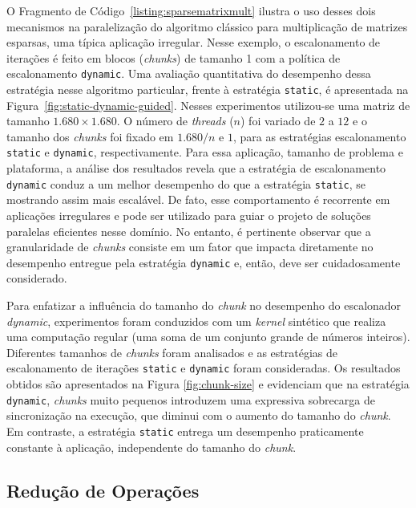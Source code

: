 \documentclass{SBCbookchapter}
\begin{document}
		O Fragmento de Código~\ref{listing:sparsematrixmult} ilustra o
		uso desses dois mecanismos na paralelização do algoritmo
		clássico para multiplicação de matrizes esparsas, uma típica
		aplicação irregular. Nesse exemplo, o escalonamento de iterações
		é feito em blocos (\textit{chunks}) de tamanho 1 com a política
		de escalonamento \texttt{dynamic}.  Uma avaliação quantitativa
		do desempenho dessa estratégia nesse algoritmo particular,
		frente à estratégia \texttt{static}, é apresentada na
		Figura~\ref{fig:static-dynamic-guided}. Nesses experimentos
		utilizou-se uma matriz de tamanho $1.680 \times 1.680$.  O
		número de \textit{threads} ($n$) foi variado de $2$ a $12$ e
		o tamanho dos \textit{chunks} foi fixado em $1.680/n$ e $1$,
		para as estratégias escalonamento \texttt{static} e
		\texttt{dynamic}, respectivamente.  Para essa aplicação,
		tamanho de problema e plataforma, a análise dos resultados
		revela que a estratégia de escalonamento \texttt{dynamic}
		conduz a um melhor desempenho do que a estratégia
		\texttt{static}, se mostrando assim mais escalável.  De
		fato, esse comportamento é recorrente em aplicações
		irregulares e pode ser utilizado para guiar o projeto de
		soluções paralelas eficientes nesse domínio. No entanto, é
		pertinente observar que a granularidade de \textit{chunks}
		consiste em um fator que impacta diretamente no desempenho
		entregue pela estratégia \texttt{dynamic} e, então, deve ser
		cuidadosamente considerado. 

		Para enfatizar a influência do tamanho do \textit{chunk} no
		desempenho do escalonador \textit{dynamic}, experimentos foram
		conduzidos com um \textit{kernel} sintético que realiza uma
		computação regular (uma soma de um conjunto grande de números
		inteiros). Diferentes tamanhos de \textit{chunks} foram
		analisados e as estratégias de escalonamento de iterações
		\texttt{static} e \texttt{dynamic} foram consideradas. Os
		resultados obtidos são apresentados na Figura
		\ref{fig:chunk-size} e evidenciam que na estratégia
		\texttt{dynamic}, \textit{chunks} muito pequenos introduzem uma
		expressiva sobrecarga de sincronização na execução, que diminui
		com o aumento do tamanho do \textit{chunk}. Em contraste, a
		estratégia \texttt{static} entrega um desempenho praticamente
		constante à aplicação, independente do tamanho do \textit{chunk}.

	\subsection{Redução de Operações}
	\label{subsection: reducao de operacoes}
\end{document}
